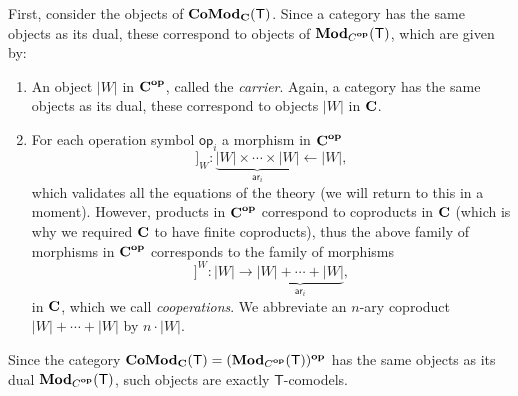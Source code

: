 \documentclass{amsart}
\newcommand{\theory}[1]{\mathsf{#1}} %
\newcommand{\ModC}[2]{\text{\textbf{Mod}}_{\category{#1}}(\theory{#2})} %
\newcommand{\ComodC}[2]{\text{\textbf{CoMod}}_{\category{#1}}(\theory{#2})} %
\newcommand{\opcat}[1]{\ensuremath{#1^{\text{\textbf{op}}}}}
\newcommand{\from}{\leftarrow}
\newcommand{\category}[1]{\text{\textbf{#1}}} %
\newcommand{\op}[1]{\mathsf{op}_{#1}} %
\newcommand{\arity}[1]{\mathsf{ar}_{#1}} %
\newcommand{\sem}[1]{[\![#1]\!]} %
\begin{document}
First, consider the objects of $\ComodC{C}{T}$. Since a category has the same objects as its dual, these correspond to objects of $\ModC{\opcat{C}}{T}$, which are given by:
%
\begin{enumerate}
\item An object $|W|$ in $\opcat{\category{C}}$, called the \emph{carrier}. Again, a category has the same objects as its dual, these correspond to objects $|W|$ in $\category{C}$.
\item For each operation symbol $\op{i}$ a morphism in $\opcat{\category{C}}$
  \begin{equation*}
    \sem{\op{i}}_W : \underbrace{|W| \times \cdots \times |W|}_{\arity{i}} \from |W|,
  \end{equation*}
  which validates all the equations of the theory (we will return to this in a moment). However, products in $\opcat{\category{C}}$ correspond to coproducts in $\category{C}$ (which is why we required $\category{C}$ to have finite coproducts), thus the above family of morphisms in $\opcat{\category{C}}$ corresponds to the family of morphisms
    \begin{equation*}
    \sem{\op{i}}^W : |W| \to \underbrace{|W| + \cdots + |W|}_{\arity{i}},
  \end{equation*}
  in $\category{C}$, which we call \emph{cooperations}. We abbreviate an $n$-ary coproduct $|W| + \cdots + |W|$ by $n \cdot |W|$.
\end{enumerate}
Since the category $\ComodC{C}{T} = \opcat{(\ModC{\opcat{C}}{T})}$ has the same objects as its dual $\ModC{\opcat{C}}{T}$, such objects are exactly $\theory{T}$-comodels.
\end{document}
